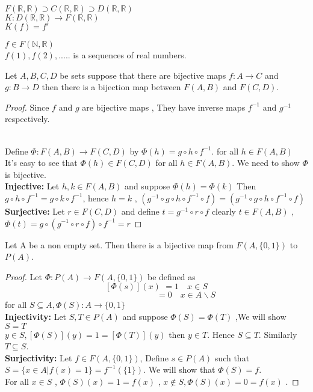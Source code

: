 \documentclass[a4paper,english,12pt]{article}   	%
\begin{document}
\begin{exmp} $F(\mathbb{R},\mathbb{R}) \supset C(\mathbb{R},\mathbb{R}) \supset D(\mathbb{R},\mathbb{R})$\\
$K \colon D(\mathbb{R},\mathbb{R}) \to F(\mathbb{R},\mathbb{R})$\\
$K(f)=f'$
\end{exmp}
\begin{exmp}
$f \in F(\mathbb{N},\mathbb{R})$ \\
$f(1),f(2),.....$ is a sequences of real numbers.
\end{exmp}
\begin{lem}
Let $A,B,C,D$ be sets suppose that there are bijective maps $f \colon A \to C$ and $g \colon B \to D$ then there is a bijection map between
$F(A,B)$ and $F(C,D)$.
\end{lem}
\begin{proof} Since $f$ and $g$ are bijective maps , They have inverse maps $f^{-1}$ and $g^{-1}$ respectively.
\begin{figure}[hhhh]
\centering
\scalebox{.8}{}
\caption{}
\label{Fig:}
\end{figure}\\
Define $\Phi \colon F(A,B) \to F(C,D)$ by $\Phi (h)=g \circ h \circ f^{-1}$. for all $h \in F(A,B)$ \\
It's easy to see that $\Phi (h) \in F(C,D)$ for all $h \in F(A,B)$. We need to show $\Phi$ is bijective.\\
\textbf{Injective:} Let $h,k \in F(A,B)$ and suppose $\Phi (h)=\Phi (k)$ Then $g \circ h \circ f^{-1} = g \circ k \circ f^{-1}$, hence $h=k$ , $(g^{-1} \circ g \circ h \circ f^{-1} \circ f)=(g^{-1} \circ g \circ h \circ f^{-1} \circ f)$\\
\textbf{Surjective:} Let $r \in F(C,D)$ and define $t=g^{-1} \circ r \circ f$ clearly $t \in F(A,B)$ , $\Phi (t)=g \circ (g^{-1} \circ r \circ f) \circ f^{-1}=r$
\end{proof}
\begin{prop} Let A be a non empty set. Then there is a bijective map from $F(A,\{0,1\})$ to $P(A)$.
\begin{proof} Let $\Phi \colon P(A) \to F(A,\{0,1\})$ be defined as\\
\[ [\Phi (s)](x)\, \, = 1  \quad  x \in S \] 
$\qquad \qquad \qquad \qquad \qquad \qquad \qquad \qquad \qquad=0 \quad  x \in A \backslash S$\\
for all $S \subseteq A , \Phi (S) \colon A \to \{0,1\}$\\
\textbf{Injectivity:} Let $S,T \in P(A)$ and suppose $\Phi (S)=\Phi (T)$ ,We will show $S=T$\\
$y \in S , [ \Phi (S)](y)=1=[ \Phi (T)](y)$ then $y \in T$. Hence $S \subseteq T$. Similarly $T \subseteq S$.\\
\textbf{Surjectivity:} Let $f \in F(A,\{0,1\})$, Define $s \in P(A)$ such that $S=\{x \in A | f(x)=1\}=f^{-1}(\{1\})$. We will show that 
$\Phi (S)=f$.\\ For all $x \in S$ , $\Phi (S)(x)=1=f(x)$ , $x \notin S , \Phi(S)(x)=0=f(x)$ .
\end{proof}
\end{prop}
\end{document}
